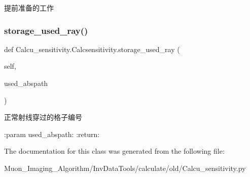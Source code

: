 \begin{DoxyVerb}提前准备的工作\end{DoxyVerb}
 \mbox{\label{classCalcu__sensitivity_1_1Calcsensitivity_a6a9a7e006d3766b4c46db8d922d5853f}} 
\subsubsection{\texorpdfstring{storage\+\_\+used\+\_\+ray()}{storage\_used\_ray()}}
{\footnotesize\ttfamily def Calcu\+\_\+sensitivity.\+Calcsensitivity.\+storage\+\_\+used\+\_\+ray (\begin{DoxyParamCaption}\item[{}]{self,  }\item[{}]{used\+\_\+abspath }\end{DoxyParamCaption})}

\begin{DoxyVerb}正常射线穿过的格子编号

:param used_abspath:
:return:
\end{DoxyVerb}
 

The documentation for this class was generated from the following file\+:\begin{DoxyCompactItemize}
\item 
Muon\+\_\+\+Imaging\+\_\+\+Algorithm/\+Inv\+Data\+Tools/calculate/old/Calcu\+\_\+sensitivity.\+py\end{DoxyCompactItemize}
